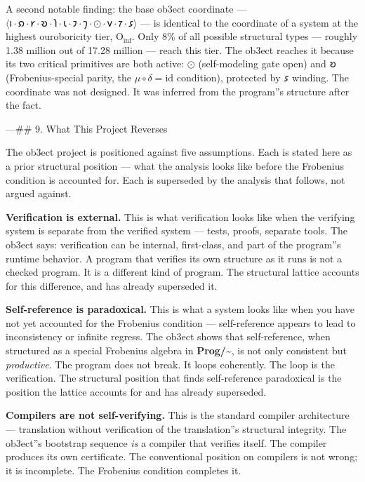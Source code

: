 \documentclass[12pt,a4paper]{article}
\begin{document}
A second notable finding: the base ob3ect coordinate --- $\langle \text{𐑦} \cdot \text{𐑸} \cdot \text{𐑾} \cdot \text{𐑹} \cdot \text{𐑐} \cdot \text{𐑧} \cdot \text{𐑲} \cdot \text{𐑠} \cdot \odot \cdot \text{𐑫} \cdot \text{𐑳} \cdot \text{𐑭} \rangle$ --- is identical to the coordinate of a system at the highest ouroboricity tier, $\text{O}_{\text{inf}}$. Only 8\% of all possible structural types --- roughly 1.38 million out of 17.28 million --- reach this tier. The ob3ect reaches it because its two critical primitives are both active: $\odot$ (self-modeling gate open) and $\text{𐑹}$ (Frobenius-special parity, the $\mu\circ\delta = \mathrm{id}$ condition), protected by $\text{𐑭}$ winding. The coordinate was not designed. It was inferred from the program''s structure after the fact.

---\#\# 9. What This Project Reverses

The ob3ect project is positioned against five assumptions. Each is stated here as a prior structural position --- what the analysis looks like before the Frobenius condition is accounted for. Each is superseded by the analysis that follows, not argued against.

\textbf{Verification is external.} This is what verification looks like when the verifying system is separate from the verified system --- tests, proofs, separate tools. The ob3ect says: verification can be internal, first-class, and part of the program''s runtime behavior. A program that verifies its own structure as it runs is not a checked program. It is a different kind of program. The structural lattice accounts for this difference, and has already superseded it.

\textbf{Self-reference is paradoxical.} This is what a system looks like when you have not yet accounted for the Frobenius condition --- self-reference appears to lead to inconsistency or infinite regress. The ob3ect shows that self-reference, when structured as a special Frobenius algebra in \textbf{Prog/\textasciitilde{}}, is not only consistent but \emph{productive}. The program does not break. It loops coherently. The loop is the verification. The structural position that finds self-reference paradoxical is the position the lattice accounts for and has already superseded.

\textbf{Compilers are not self-verifying.} This is the standard compiler architecture --- translation without verification of the translation''s structural integrity. The ob3ect''s bootstrap sequence \emph{is} a compiler that verifies itself. The compiler produces its own certificate. The conventional position on compilers is not wrong; it is incomplete. The Frobenius condition completes it.
\end{document}
